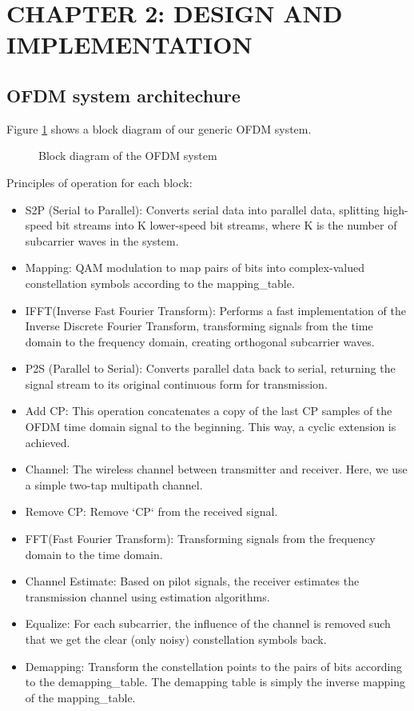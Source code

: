 \section*{CHAPTER 2:  DESIGN AND IMPLEMENTATION}
\setcounter{section}{2}
\setcounter{subsection}{0}
\setcounter{figure}{0}
\setcounter{table}{0}

\subsection{OFDM system architechure}
Figure \ref{diagram} shows a block diagram of our generic OFDM system.

\begin{figure}[htbp]
    \centering
    
    \caption{Block diagram of the OFDM system}
    \label{diagram}
\end{figure}

Principles of operation for each block:
\begin{itemize}
    \item S2P (Serial to Parallel): Converts serial data into parallel data, splitting high-speed bit streams into K lower-speed bit streams, where K is the number of subcarrier waves in the system.
    \item Mapping: QAM modulation to map pairs of bits into complex-valued constellation symbols according to the mapping\_table.
    \item IFFT(Inverse Fast Fourier Transform): Performs a fast implementation of the Inverse Discrete Fourier Transform, transforming signals from the time domain to the frequency domain, creating orthogonal subcarrier waves.
    \item P2S (Parallel to Serial): Converts parallel data back to serial, returning the signal stream to its original continuous form for transmission.
    \item Add CP:  This operation concatenates a copy of the last CP samples of the OFDM time domain signal to the beginning. This way, a cyclic extension is achieved.
    \item Channel: The wireless channel between transmitter and receiver. Here, we use a simple two-tap multipath channel.
    \item Remove CP: Remove `CP` from the received signal.
    \item FFT(Fast Fourier Transform): Transforming signals from the frequency domain to the time domain.
    \item Channel Estimate: Based on pilot signals, the receiver estimates the transmission channel using estimation algorithms.
    \item Equalize: For each subcarrier, the influence of the channel is removed such that we get the clear (only noisy) constellation symbols back.
    \item Demapping: Transform the constellation points to the pairs of bits according to the demapping\_table. The demapping table is simply the inverse mapping of the mapping\_table.
\end{itemize}

\newpage